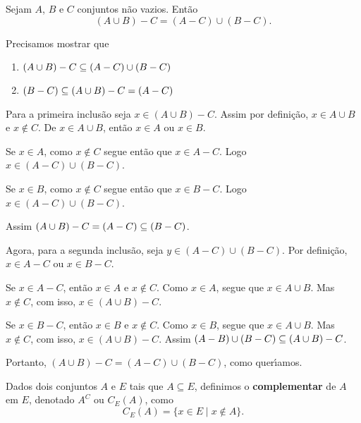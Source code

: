 \begin{proposicao}
    Sejam $A$, $B$ e $C$ conjuntos n\~ao vazios. Ent\~ao
    \[
        (A \cup B) - C = (A - C) \cup (B - C).
    \]
\end{proposicao}
\begin{prova}
    Precisamos mostrar que
    \begin{enumerate}[label={\arabic*})]
        \item $(A \cup B) - C \subseteq (A - C) \cup (B - C)$
        \item $(B - C) \subseteq (A \cup B) - C = (A - C)$
    \end{enumerate}
    Para a primeira inclus\~ao seja $x \in (A \cup B) - C$. Assim por defini\c{c}\~ao, $x \in A \cup B$ e $x \notin C$. De $x \in A \cup B$, ent\~ao $x \in A$ ou $x \in B$.

    Se $x \in A$, como $x \notin C$ segue ent\~ao que $x \in A - C$. Logo $x \in (A - C) \cup (B - C)$.

    Se $x \in B$, como $x \notin C$ segue ent\~ao que $x \in B - C$. Logo $x \in (A - C) \cup (B - C)$.

    Assim $(A \cup B) - C = (A - C) \subseteq (B - C)$.

    Agora, para a segunda inclus\~ao, seja $y \in (A - C) \cup (B - C)$. Por defini\c{c}\~ao, $x \in A - C$ ou $x \in B - C$.

    Se $x \in A - C$, ent\~ao $x \in A$ e $x \notin C$. Como $x \in A$, segue que $x \in A \cup B$. Mas $x \notin C$, com isso, $x \in (A \cup B) - C$.

    Se $x \in B - C$, ent\~ao $x \in B$ e $x \notin C$. Como $x \in B$, segue que $x \in A \cup B$. Mas $x \notin C$, com isso, $x \in (A \cup B) - C$.
    Assim $(A - B) \cup (B - C) \subseteq (A \cup B) - C$.

    Portanto, $(A \cup B) - C = (A - C) \cup (B - C)$, como quer{\'\i}amos.
\end{prova}

\begin{definicao}
    Dados dois conjuntos $A$ e $E$ tais que $A\subseteq E$, definimos o \textbf{complementar} de $A$ em $E$, denotado $A^C$ ou $C_E(A)$, como
    \[
        C_E(A) = \{ x \in E \mid x \notin A \}.
    \]

\end{definicao}

